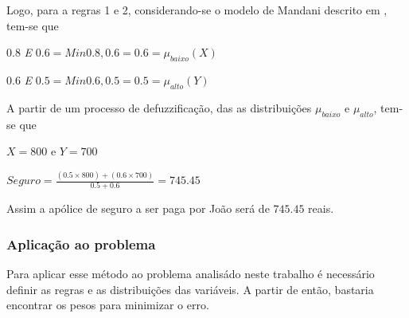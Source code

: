  Logo, para a regras 1 e 2, considerando-se o modelo de Mandani descrito em \cite{passos2005datamining}, tem-se que 
 \begin{description}
   \item $0.8$ \emph{E} $0.6 = Min{0.8,0.6} = 0.6 = \mu_{baixo}(X)$ 
   \item $0.6$ \emph{E} $0.5 = Min{0.6,0.5} = 0.5 = \mu_{alto}(Y)$
 \end{description}
 
 A partir de um processo de defuzzificação, das as distribuições $\mu_{baixo}$ e $\mu_{alto}$, tem-se que
 \begin{description}
   \item $X = 800$ e $Y=700$
   \item $Seguro = \frac{(0.5 \times 800)+(0.6 \times 700)}{0.5 + 0.6} = 745.45$
 \end{description}
 
 Assim a apólice de seguro a ser paga por João será de $745.45$ reais.

\subsubsection{Aplicação ao problema}

Para aplicar esse método ao problema analisádo neste trabalho é necessário definir as regras e as distribuições
das variáveis. A partir de então, bastaria encontrar os pesos para minimizar o erro.
